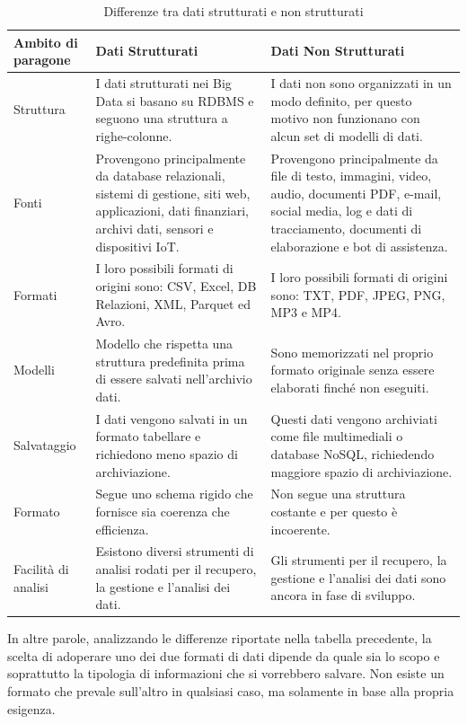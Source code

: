 \begin{longtable}{|p{2cm}|p{6cm}|p{6cm}|}
    \caption{Differenze tra dati strutturati e non strutturati} \\
    \hline
    \textbf{Ambito di paragone} & \textbf{Dati Strutturati} & \textbf{Dati Non Strutturati} \\
    \hline
    \endfirsthead

    Struttura & I dati strutturati nei Big Data si basano su RDBMS e seguono una struttura a righe-colonne. &  I dati non sono organizzati in un modo definito, per questo motivo non funzionano con alcun set di modelli di dati. \\
    \hline
    Fonti & Provengono principalmente da database relazionali, sistemi di gestione, siti web, applicazioni, dati finanziari, archivi dati, sensori e dispositivi IoT. & Provengono principalmente da file di testo, immagini, video, audio, documenti PDF, e-mail, social media, log e dati di tracciamento, documenti di elaborazione e bot di assistenza.\\
    \hline
    Formati & I loro possibili formati di origini sono: CSV, Excel, DB Relazioni, XML, Parquet ed Avro. & I loro possibili formati di origini sono: TXT, PDF, JPEG, PNG, MP3 e MP4.\\
    \hline
    Modelli & Modello che rispetta una struttura predefinita prima di essere salvati nell'archivio dati. & Sono memorizzati nel proprio formato originale senza essere elaborati finché non eseguiti.\\
    \hline
    Salvataggio & I dati vengono salvati in un formato tabellare e richiedono meno spazio di archiviazione. & Questi dati vengono archiviati come file multimediali o database NoSQL, richiedendo maggiore spazio di archiviazione.\\
    \hline
    Formato & Segue uno schema rigido che fornisce sia coerenza che efficienza. & Non segue una struttura costante e per questo è incoerente.\\
    \hline
    Facilità di analisi & Esistono diversi strumenti di analisi rodati per il recupero, la gestione e l'analisi dei dati. & Gli strumenti per il recupero, la gestione e l'analisi dei dati sono ancora in fase di sviluppo.\\
    \hline
\end{longtable}

In altre parole, analizzando le differenze riportate nella tabella precedente, la scelta di adoperare uno dei due formati di dati dipende da quale sia lo scopo e soprattutto la tipologia di informazioni che si vorrebbero salvare. Non esiste un formato che prevale sull'altro in qualsiasi caso, ma solamente in base alla propria esigenza.

